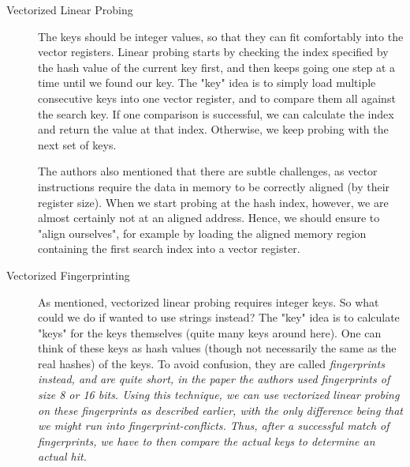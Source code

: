 \documentclass[../../main.tex]{subfiles}
\begin{document}
\begin{description}
    \item[Vectorized Linear Probing] The keys should be integer values, so that they can fit comfortably into the vector registers. Linear probing starts by checking the index specified by the hash value of the current key first, and then keeps going one step at a time until we found our key. The "key" idea is to simply load multiple consecutive keys into one vector register, and to compare them all against the search key. If one comparison is successful, we can calculate the index and return the value at that index. Otherwise, we keep probing with the next set of keys.
    
    The authors also mentioned that there are subtle challenges, as vector instructions require the data in memory to be correctly aligned (by their register size). When we start probing at the hash index, however, we are almost certainly not at an aligned address. Hence, we should ensure to "align ourselves", for example by loading the aligned memory region containing the first search index into a vector register.

    \item[Vectorized Fingerprinting] As mentioned, vectorized linear probing requires integer keys. So what could we do if wanted to use strings instead? The "key" idea is to calculate "keys" for the keys themselves (quite many keys around here). One can think of these keys as hash values (though not necessarily the same as the real hashes) of the keys. To avoid confusion, they are called \em fingerprints \em instead, and are quite short, in the paper the authors used fingerprints of size 8 or 16 bits. Using this technique, we can use vectorized linear probing on these fingerprints as described earlier, with the only difference being that we might run into fingerprint-conflicts. Thus, after a successful match of fingerprints, we have to then compare the actual keys to determine an actual hit.
\end{description}
\end{document}
